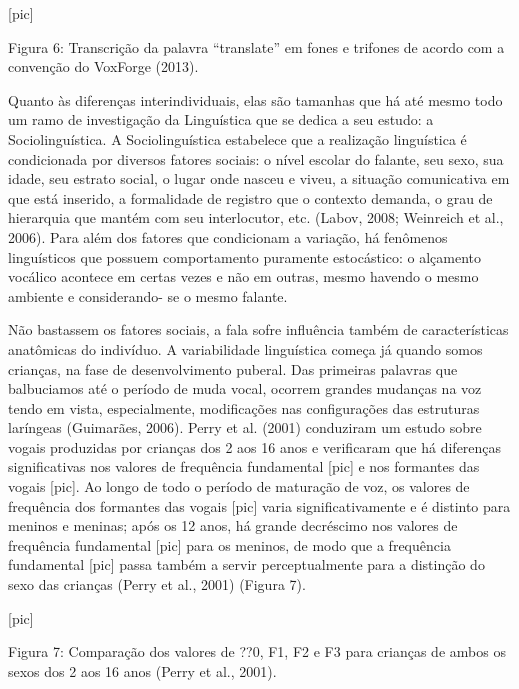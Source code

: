                                 [pic]

Figura 6: Transcri\c{c}\~ao da palavra ``translate'' em fones e trifones de
acordo com a conven\c{c}\~ao do VoxForge (2013).

Quanto às diferen\c{c}as interindividuais, elas s\~ao tamanhas que h\'a at\'e
mesmo todo um ramo de investiga\c{c}\~ao da Lingu\'istica que se dedica a seu
estudo: a Sociolingu\'istica. A Sociolingu\'istica estabelece que a
realiza\c{c}\~ao lingu\'istica \'e condicionada por diversos fatores sociais: o
n\'ivel escolar do falante, seu sexo, sua idade, seu estrato social, o
lugar onde nasceu e viveu, a situa\c{c}\~ao comunicativa em que est\'a inserido,
a formalidade de registro que o contexto demanda, o grau de hierarquia
que mant\'em com seu interlocutor, etc. (Labov, 2008; Weinreich et al.,
2006). Para al\'em dos fatores que condicionam a varia\c{c}\~ao, h\'a fen\^omenos
lingu\'isticos que possuem comportamento puramente estoc\'astico: o
al\c{c}amento voc\'alico acontece em certas vezes e n\~ao em outras, mesmo
havendo o mesmo ambiente e considerando- se o mesmo falante.

N\~ao bastassem os fatores sociais, a fala sofre influ\^encia tamb\'em de
caracter\'isticas anat\^omicas do indiv\'iduo. A variabilidade lingu\'istica
come\c{c}a j\'a quando somos crian\c{c}as, na fase de desenvolvimento puberal. Das
primeiras palavras que balbuciamos at\'e o per\'iodo de muda vocal, ocorrem
grandes mudan\c{c}as na voz tendo em vista, especialmente, modifica\c{c}\~oes nas
configura\c{c}\~oes das estruturas lar\'ingeas (Guimar\~aes, 2006). Perry et al.
(2001) conduziram um estudo sobre vogais produzidas por crian\c{c}as dos 2
aos 16 anos e verificaram que h\'a diferen\c{c}as significativas nos valores
de frequ\^encia fundamental {[}pic{]} e nos formantes das vogais
{[}pic{]}. Ao longo de todo o per\'iodo de matura\c{c}\~ao de voz, os valores de
frequ\^encia dos formantes das vogais {[}pic{]} varia significativamente e
\'e distinto para meninos e meninas; ap\'os os 12 anos, h\'a grande decr\'escimo
nos valores de frequ\^encia fundamental {[}pic{]} para os meninos, de modo
que a frequ\^encia fundamental {[}pic{]} passa tamb\'em a servir
perceptualmente para a distin\c{c}\~ao do sexo das crian\c{c}as (Perry et al.,
2001) (Figura 7).

                                [pic]

Figura 7: Compara\c{c}\~ao dos valores de ??0, F1, F2 e F3 para crian\c{c}as de
ambos os sexos dos 2 aos 16 anos (Perry et al., 2001).

